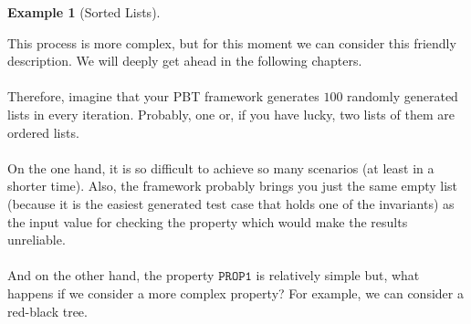 \documentclass{report}
\theoremstyle{definition}
\newtheorem{example}{Example}[section]
\theoremstyle{definition}
\begin{document}
\begin{example}[Sorted Lists]
\begin{enumerate}
	\end{enumerate}
	This process is more complex, but for this moment we can consider this friendly description. We will deeply get ahead in the following chapters.\\\\
	Therefore, imagine that your PBT framework generates $100$ randomly generated lists in every iteration. Probably, one or, if you have lucky, two lists of them are ordered lists.\\\\
	On the one hand, it is so difficult to achieve so many scenarios (at least in a shorter time). Also, the framework probably brings you just the same empty list (because it is the easiest generated test case that holds one of the invariants) as the input value for checking the property which would make the results unreliable.\\\\
	And on the other hand, the property $\mathtt{PROP1}$ is relatively simple but, what happens if we consider a more complex property? For example, we can consider a red-black tree.
\end{example}
\end{document}
